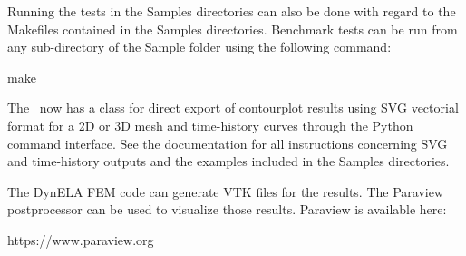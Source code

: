 Running the tests in the Samples directories can also be done with regard to the Makefiles contained in the Samples directories. Benchmark tests can be run from any sub-directory of the Sample folder using the following command:

\begin{BashListing}[numbers=none]
make
\end{BashListing}

The \DynELA~now has a class for direct export of contourplot results using SVG vectorial format for a 2D or 3D mesh and time-history curves through the Python command interface. See the documentation for all instructions concerning SVG and time-history outputs and the examples included in the Samples directories.

The DynELA FEM code can generate VTK files for the results. The Paraview postprocessor can be used to visualize those results. Paraview is available here:

\hspace*{1cm}\textsf{\hspace*{1cm}\textsf{https://www.paraview.org}}
